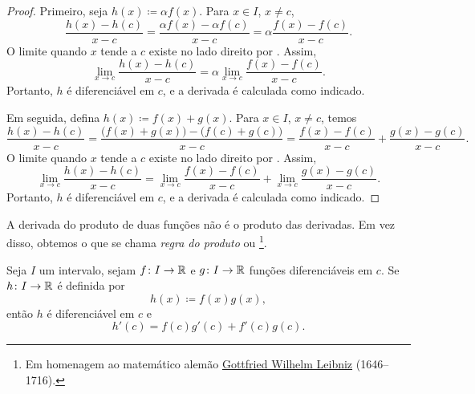 \begin{proof}
Primeiro, seja $h(x) \coloneqq \alpha f(x)$.
Para $x \in I$, $x \neq c$,
\begin{equation*}
\frac{h(x)-h(c)}{x-c} =
\frac{\alpha f(x) - \alpha f(c)}{x-c}
=
\alpha \frac{f(x) - f(c)}{x-c} .
\end{equation*}
O limite quando $x$ tende a $c$ existe no lado direito
por . Assim,
\begin{equation*}
\lim_{x\to c}\frac{h(x)-h(c)}{x-c} =
\alpha \lim_{x\to c} \frac{f(x) - f(c)}{x-c} .
\end{equation*}
Portanto, $h$ é diferenciável em $c$,
e a derivada é calculada como indicado.

Em seguida, defina $h(x) \coloneqq f(x)+g(x)$.
Para $x \in I$, $x \neq c$, temos
\begin{equation*}
\frac{h(x)-h(c)}{x-c} =
\frac{\bigl(f(x) + g(x)\bigr) - \bigl(f(c) + g(c)\bigr)}{x-c}
=
\frac{f(x) - f(c)}{x-c}
+
\frac{g(x) - g(c)}{x-c} .
\end{equation*}
O limite quando $x$ tende a $c$ existe no lado direito
por . Assim,
\begin{equation*}
\lim_{x\to c}\frac{h(x)-h(c)}{x-c} =
\lim_{x\to c} \frac{f(x) - f(c)}{x-c}
+
\lim_{x\to c}\frac{g(x) - g(c)}{x-c} .
\end{equation*}
Portanto, $h$ é diferenciável em $c$,
e a derivada é calculada como indicado.
\end{proof}

A derivada do produto de duas funções não é o produto das derivadas.
Em vez disso, obtemos o que se chama \emph{regra do produto}
ou \emph{}%
\footnote{Em homenagem ao matemático alemão
\href{https://en.wikipedia.org/wiki/Leibniz}{Gottfried Wilhelm Leibniz}
(1646--1716).}.

\begin{prop}
Seja $I$ um intervalo, sejam
$f \colon I \to {\mathbb{R}}$ e $g \colon I \to {\mathbb{R}}$ funções diferenciáveis em $c$.
Se $h \colon I \to {\mathbb{R}}$ é definida por
\begin{equation*}
h(x) \coloneqq f(x) g(x) ,
\end{equation*}
então $h$ é diferenciável em $c$ e
\begin{equation*}
h'(c) = f(c) g'(c) + f'(c) g(c) .
\end{equation*}
\end{prop}

